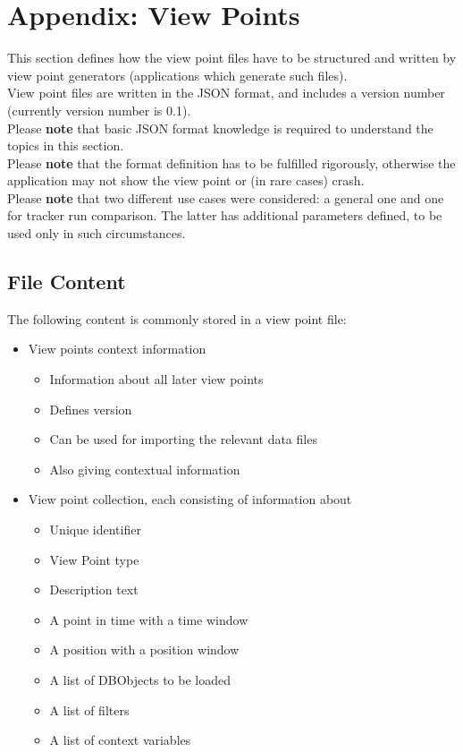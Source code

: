 \section{Appendix: View Points}
\label{sec:appendix_view_points} 

This section defines how the view point files have to be structured and written by view point generators (applications which generate such files). \\

View point files are written in the JSON format, and includes a version number (currently version number is 0.1). \\

Please \textbf{note} that basic JSON format knowledge is required to understand the topics in this section. \\

Please \textbf{note} that the format definition has to be fulfilled rigorously, otherwise the application may not show the view point or (in rare cases) crash. \\

Please \textbf{note} that two different use cases were considered: a general one and one for tracker run comparison. The latter has additional parameters defined, to be used only in such circumstances.

\subsection{File Content}

The following content is commonly stored in a view point file:
 \begin{itemize}
 \item View points context information
 \begin{itemize}
 \item Information about all later view points
 \item Defines version
 \item Can be used for importing the relevant data files
 \item Also giving contextual information
 \end{itemize}
 \item View point collection, each consisting of information about
 \begin{itemize}
 \item Unique identifier
 \item View Point type
 \item Description text
 \item A point in time with a time window
 \item A position with a position window
 \item A list of DBObjects to be loaded
 \item A list of filters
 \item A list of context variables
  \end{itemize}
 \end{itemize}

